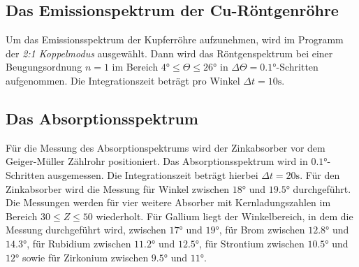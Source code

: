 \subsection{Das Emissionspektrum der Cu-Röntgenröhre}
Um das Emissionsspektrum der Kupferröhre aufzunehmen, wird im Programm der \textit{2:1 Koppelmodus}
ausgewählt. Dann wird das Röntgenspektrum bei einer Beugungsordnung $n=1$ im Bereich
$4 \si{\degree} \leq \Theta \leq 26 \si{\degree}$ in $\Delta \Theta = 0.1 \si{\degree}$-Schritten aufgenommen.
Die Integrationszeit beträgt pro Winkel $\Delta t = 10 \si{\second}$.


\subsection{Das Absorptionsspektrum}
Für die Messung des Absorptionspektrums wird der Zinkabsorber vor dem Geiger-Müller
Zählrohr positioniert. Das Absorptionsspektrum wird in $0.1 \si{\degree}$-Schritten ausgemessen.
Die Integrationszeit beträgt hierbei $\Delta t = 20 \si{\second}$. Für den Zinkabsorber
wird die Messung für Winkel zwischen $18 \si{\degree}$ und $19.5 \si{\degree}$ durchgeführt.
Die Messungen werden für vier weitere Absorber mit Kernladungszahlen im Bereich
$30 \leq Z \leq 50$ wiederholt. Für Gallium liegt der Winkelbereich, in dem die
Messung durchgeführt wird, zwischen
$17 \si{\degree}$ und $19 \si{\degree}$, für Brom zwischen $12.8 \si{\degree}$
und $14.3 \si{\degree}$, für Rubidium zwischen $11.2 \si{\degree}$ und $12.5 \si{\degree}$,
für Strontium zwischen $10.5 \si{\degree}$ und $12 \si{\degree}$ sowie für Zirkonium zwischen
$9.5 \si{\degree}$ und $11 \si{\degree}$.
